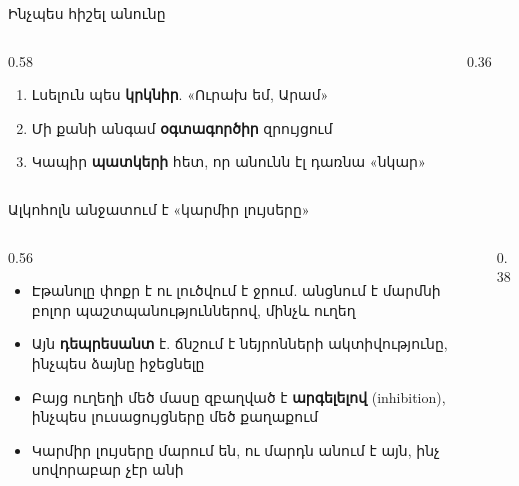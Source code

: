\begin{frame}{Ինչպես հիշել անունը}
  \begin{columns}[c]
    \begin{column}{0.58\textwidth}
      \begin{enumerate}
        \item Լսելուն պես \textbf{կրկնիր}. «Ուրախ եմ, Արամ»
        \item Մի քանի անգամ \textbf{օգտագործիր} զրույցում
        \item Կապիր \textbf{պատկերի} հետ, որ անունն էլ դառնա «նկար»
      \end{enumerate}
    \end{column}
    \begin{column}{0.36\textwidth}
      \centering
    \end{column}
  \end{columns}
\end{frame}


\begin{frame}{Ալկոհոլն անջատում է «կարմիր լույսերը»}
  \begin{columns}[c]
    \begin{column}{0.56\textwidth}
      \begin{itemize}
        \item Էթանոլը փոքր է ու լուծվում է ջրում. անցնում է մարմնի բոլոր պաշտպանություններով, մինչև ուղեղ
        \item Այն \textbf{դեպրեսանտ} է. ճնշում է նեյրոնների ակտիվությունը, ինչպես ձայնը իջեցնելը 
        \item<2-> Բայց ուղեղի մեծ մասը զբաղված է \textbf{արգելելով} (inhibition), ինչպես լուսացույցները մեծ քաղաքում 
        \item<3-> Կարմիր լույսերը մարում են, ու մարդն անում է այն, ինչ սովորաբար չէր անի
      \end{itemize}
    \end{column}
    \begin{column}{0.38\textwidth}
    \end{column}
  \end{columns}
\end{frame}

